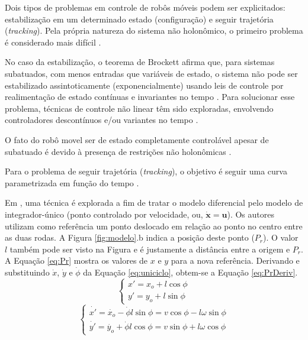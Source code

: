 Dois tipos de problemas em controle de robôs móveis podem ser explicitados:
estabilização em um determinado estado (configuração) e seguir trajetória
(\textit{tracking}). Pela própria natureza do sistema não holonômico, o primeiro
problema é considerado mais difícil \cite{tese:franca}.

No caso da estabilização, o teorema de Brockett afirma que, para sistemas
subatuados, com menos entradas que variáveis de estado, o sistema não pode ser
estabilizado assintoticamente (exponencialmente) usando leis de controle por
realimentação de estado contínuas e invariantes no tempo
\cite{artigo:ASTOLFI1995661, inbook:Ravi_Mumbai}.
Para solucionar esse problema, técnicas de controle não linear têm sido
exploradas, envolvendo controladores descontínuos e/ou variantes no tempo
\cite{tese:franca}.  

O fato do robô movel ser de estado completamente controlável
apesar de subatuado é devido à presença de restrições não holonômicas
\cite{Oriolo2013}.

Para o problema de seguir trajetória (\textit{tracking}), o objetivo é seguir
uma curva parametrizada em função do tempo \cite{art:Manuel}. 

Em , uma técnica é explorada a fim de tratar o
modelo diferencial pelo modelo de integrador-único (ponto controlado por
velocidade, ou, $\mathbf{\dot{x}} = \mathbf{u}$). Os autores utilizam como
referência um ponto deslocado em relação ao ponto no centro entre as duas rodas.
A Figura \ref{fig:modelo}.b indica a posição deste ponto ($P_r$). O valor $l$ também
pode ser visto na Figura e é justamente a distância entre a origem e $P_r$. A Equação 
\ref{eq:Pr} mostra os valores de $x$ e $y$ para a nova referência. Derivando e
substituindo $\dot{x}$, $\dot{y}$ e $\dot{\phi}$ da Equação \ref{eq:uniciclo},
obtem-se a Equação \ref{eq:PrDeriv}. 
\begin{equation}
	\label{eq:Pr}
	\left \{ \begin{matrix} x' = x_o + l\cos{\phi}
	\\
	y' = y_o + l\sin{\phi}
	\end{matrix} \right.
\end{equation}
\begin{equation}
	\label{eq:PrDeriv}
	\left \{ \begin{matrix} \dot{x'} = \dot{x_o} - \dot{\phi}l\sin{\phi} =
	v\cos{\phi} - l\omega\sin{\phi}
	\\
	\dot{y'} = \dot{y_o} + \dot{\phi}l\cos{\phi} = v\sin{\phi} + l\omega\cos{\phi}
	\end{matrix} \right.
\end{equation}

